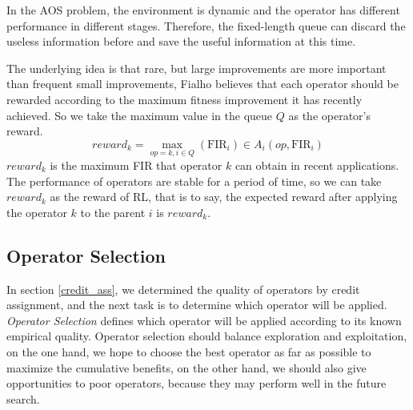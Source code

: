 \documentclass[journal]{IEEEtran}
\begin{document}
In the AOS problem, the environment is dynamic and the operator has different performance in different stages. Therefore, the fixed-length queue can discard the useless information before and save the useful information at this time.

The underlying idea is that rare, but large improvements are more important than frequent small improvements, Fialho \cite{fialho2010comparison} believes that each operator should be rewarded according to the maximum fitness improvement it has recently achieved.
So we take the maximum value in the queue $Q$ as the operator's reward.
\begin{equation}
  reward_k = \max_{op=k, i\in Q}(\text{FIR}_i) \in A_i(op,\text{FIR}_i)
\end{equation}
$reward_k$ is the maximum FIR that operator $k$ can obtain in recent applications.
The performance of operators are stable for a period of time, so we can take $reward_k$ as the reward of RL, that is to say, the expected reward after applying the operator $k$ to the parent $i$ is $reward_k$.


\subsection{Operator Selection \label{operator_selection}}
In section \ref{credit_ass}, we determined the quality of operators by credit assignment, and the next task is to determine which operator will be applied. \textit{Operator Selection} defines which operator will be applied according to its known empirical quality.
Operator selection should balance exploration and exploitation, on the one hand, we hope to choose the best operator as far as possible to maximize the cumulative benefits, on the other hand, we should also give opportunities to poor operators, because they may perform well in the future search.
\end{document}
